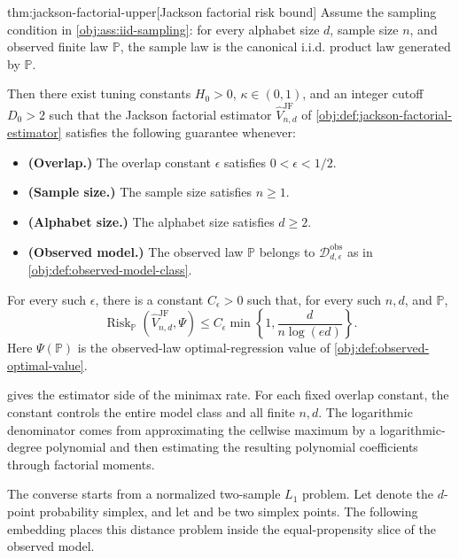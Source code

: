\begin{theoremv}{thm:jackson-factorial-upper}[Jackson factorial risk bound]
Assume the sampling condition in \cref{obj:ass:iid-sampling}: for every alphabet size \(d\), sample size \(n\), and observed finite law \(\mathbb P\), the sample law is the canonical i.i.d. product law generated by \(\mathbb P\).

Then there exist tuning constants \(H_0>0\), \(\kappa\in(0,1)\), and an integer cutoff \(D_0>2\) such that the Jackson factorial estimator \(\widehat V_{n,d}^{\mathrm{JF}}\) of \cref{obj:def:jackson-factorial-estimator} satisfies the following guarantee whenever:
\begin{itemize}
\item \textbf{(Overlap.)} The overlap constant \(\epsilon\) satisfies \(0<\epsilon<1/2\).
\item \textbf{(Sample size.)} The sample size satisfies \(n\ge 1\).
\item \textbf{(Alphabet size.)} The alphabet size satisfies \(d\ge 2\).
\item \textbf{(Observed model.)} The observed law \(\mathbb P\) belongs to \(\mathcal D_{d,\epsilon}^{\mathrm{obs}}\) as in \cref{obj:def:observed-model-class}.
\end{itemize}
For every such \(\epsilon\), there is a constant \(C_\epsilon>0\) such that, for every such \(n,d\), and \(\mathbb P\),
\[
\operatorname{Risk}_{\mathbb P}
\left(\widehat V_{n,d}^{\mathrm{JF}},\Psi\right)
\le
C_\epsilon \min\left\{1,\frac{d}{n\log(ed)}\right\}.
\]
Here \(\Psi(\mathbb P)\) is the observed-law optimal-regression value of \cref{obj:def:observed-optimal-value}.
\end{theoremv}

 gives the estimator side of the minimax rate. For each fixed overlap constant, the constant  controls the entire model class and all finite \(n,d\). The logarithmic denominator comes from approximating the cellwise maximum by a logarithmic-degree polynomial and then estimating the resulting polynomial coefficients through factorial moments.

The converse starts from a normalized two-sample \(L_1\) problem. Let  denote the \(d\)-point probability simplex, and let  and  be two simplex points. The following embedding places this distance problem inside the equal-propensity slice of the observed model.

